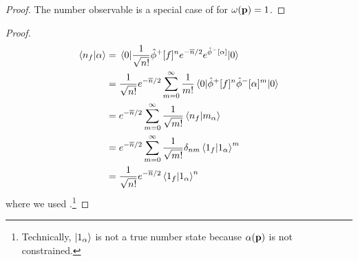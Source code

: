 \qkgcoherentnumber
\begin{proof}
	The number observable is a special case of  for $\omega(\vb{p})=1$.
\end{proof}

\qkgcoherentnumberinnerproduct
\begin{proof}
	\begin{equation*}
		\begin{split}
			\braket{n_f}{\alpha}
			&=
			\expval{
				\frac{1}{\sqrt{n!}}
				\hat\phi^+[f]^n
				e^{-\overline{n}/2}
				e^{\hat\phi^-[\alpha]}
			}{0}
			\\
			&=
			\frac{1}{\sqrt{n!}}
			e^{-\overline{n}/2}
			\sum_{m=0}^\infty
			\frac{1}{m!}
			\expval{
				\hat\phi^+[f]^n
				\hat\phi^-[\alpha]^m
			}{0}
			\\
			&=
			e^{-\overline{n}/2}
			\sum_{m=0}^\infty
			\frac{1}{\sqrt{m!}}
			\braket{n_f}{m_\alpha}
			\\
			&=
			e^{-\overline{n}/2}
			\sum_{m=0}^\infty
			\frac{1}{\sqrt{m!}}
			\delta_{nm}
			\braket{1_f}{1_\alpha}^m
			\\
			&=
			\frac{1}{\sqrt{n!}}
			e^{-\overline{n}/2}
			\braket{1_f}{1_\alpha}^n
		\end{split}
	\end{equation*}
	where we used .\footnote{Technically, $\ket{1_\alpha}$ is not a true number state because $\alpha(\vb{p})$ is not constrained.}
\end{proof}
\qkgcoherentinnerproduct
